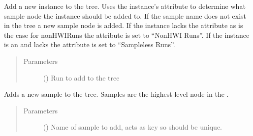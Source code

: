 \documentclass[letterpaper,10pt,english]{sphinxmanual}
\begin{document}
\begin{fulllineitems}
\begin{fulllineitems}
\label{\detokenize{polo.widgets:polo.widgets.run_tree.RunTree.add_run_to_tree}}
Add a new  instance to the tree. Uses the  instance’s 
 attribute to determine what sample node 
the  instance should be added
to. If the sample name does not exist in the tree a new sample node is added.
If the  instance lacks the  attribute as is the case for 
non\sphinxhyphen{}HWIRuns the  attribute is set to “Non\sphinxhyphen{}HWI Runs”. 
If the  instance is an  and lacks the 
 attribute  is
set to “Sampleless Runs”.
\begin{quote}\begin{description}
\item[{Parameters}] \leavevmode
{} ({\hyperref[\detokenize{polo.crystallography:polo.crystallography.run.Run}]{}}) \textendash{} Run to add to the tree

\end{description}\end{quote}

\end{fulllineitems}


\begin{fulllineitems}
\label{\detokenize{polo.widgets:polo.widgets.run_tree.RunTree.add_sample}}
Adds a new sample to the tree. Samples are the
highest level node in the .
\begin{quote}\begin{description}
\item[{Parameters}] \leavevmode
{} () \textendash{} Name of sample to add, acts as key so should 
be unique.


\end{description}
\end{quote}
\end{fulllineitems}
\end{fulllineitems}
\end{document}
